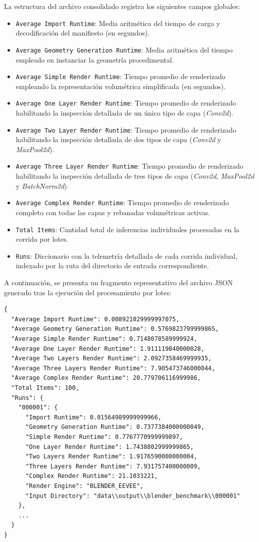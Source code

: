 La estructura del archivo consolidado registra los siguientes campos globales:
\begin{itemize}
    \item \texttt{Average Import Runtime}: Media aritmética del tiempo de carga y decodificación del manifiesto (en segundos).
    \item \texttt{Average Geometry Generation Runtime}: Media aritmética del tiempo empleado en instanciar la geometría 
    procedimental.
    \item \texttt{Average Simple Render Runtime}: Tiempo promedio de renderizado empleando la representación volumétrica simplificada (en segundos).
    \item \texttt{Average One Layer Render Runtime}: Tiempo promedio de renderizado habilitando la 
    inspección detallada de un único tipo de capa (\textit{Conv2d}).
    \item \texttt{Average Two Layer Render Runtime}: Tiempo promedio de renderizado habilitando la inspección 
    detallada de dos tipos de capa (\textit{Conv2d} y \textit{MaxPool2d}).
    \item \texttt{Average Three Layer Render Runtime}: Tiempo promedio de renderizado habilitando la inspección detallada 
    de tres tipos de capa (\textit{Conv2d}, \textit{MaxPool2d} y \textit{BatchNorm2d}).
    \item \texttt{Average Complex Render Runtime}: Tiempo promedio de renderizado completo con todas las capas y rebanadas volumétricas activas.
    \item \texttt{Total Items}: Cantidad total de inferencias individuales procesadas en la corrida por lotes.
    \item \texttt{Runs}: Diccionario con la telemetría detallada de cada corrida individual, indexado por la ruta del directorio de entrada correspondiente.
\end{itemize}

A continuación, se presenta un fragmento representativo del archivo JSON generado tras la ejecución del procesamiento por lotes:
\begin{verbatim}
{
  "Average Import Runtime": 0.008921029999997075,
  "Average Geometry Generation Runtime": 0.5769823799999865,
  "Average Simple Render Runtime": 0.7148078589999924,
  "Average One Layer Render Runtime": 1.911119840000028,
  "Average Two Layers Render Runtime": 2.0927358469999935,
  "Average Three Layers Render Runtime": 7.905473746000044,
  "Average Complex Render Runtime": 20.779706116999986,
  "Total Items": 100,
  "Runs": {
    "000001": {
      "Import Runtime": 0.01564989999999966,
      "Geometry Generation Runtime": 0.7377384000000049,
      "Simple Render Runtime": 0.7767770999999897,
      "One Layer Render Runtime": 1.7438802999999865,
      "Two Layers Render Runtime": 1.9176590000000004,
      "Three Layers Render Runtime": 7.931757400000009,
      "Complex Render Runtime": 21.1033221,
      "Render Engine": "BLENDER_EEVEE",
      "Input Directory": "data\\output\\blender_benchmark\\000001"
    },
    ...
  }
}
\end{verbatim}
